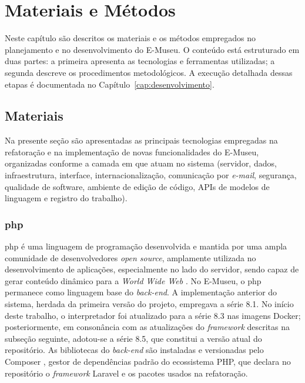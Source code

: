 \chapter{Materiais e Métodos}\label{cap:materiais-e-metodos}

Neste capítulo são descritos os materiais e os métodos empregados no planejamento e no desenvolvimento do E-Museu. O conteúdo está estruturado em duas partes: a primeira apresenta as tecnologias e ferramentas utilizadas; a segunda descreve os procedimentos metodológicos. A execução detalhada dessas etapas é documentada no Capítulo~\ref{cap:desenvolvimento}.


\section{Materiais}\label{sec:materiais}

Na presente seção são apresentadas as principais tecnologias empregadas na refatoração e na implementação de novas funcionalidades do E-Museu, organizadas conforme a camada em que atuam no sistema (servidor, dados, infraestrutura, interface, internacionalização, comunicação por \textit{e-mail}, segurança, qualidade de software, ambiente de edição de código, APIs de modelos de linguagem e registro do trabalho).


\subsection{\acrshort{php}}

\acrfull{php} é uma linguagem de programação desenvolvida e mantida por uma ampla comunidade de desenvolvedores \textit{open source}, amplamente utilizada no desenvolvimento de aplicações, especialmente no lado do servidor, sendo capaz de gerar conteúdo dinâmico para a \textit{World Wide Web} \cite{php}. No E-Museu, o \acrshort{php} permanece como linguagem base do \textit{back-end}. A implementação anterior do sistema, herdada da primeira versão do projeto, empregava a série 8.1. No início deste trabalho, o interpretador foi atualizado para a série 8.3 nas imagens Docker; posteriormente, em consonância com as atualizações do \textit{framework} descritas na subseção seguinte, adotou-se a série 8.5, que constitui a versão atual do repositório. As bibliotecas do \textit{back-end} são instaladas e versionadas pelo Composer \cite{composer}, gestor de dependências padrão do ecossistema PHP, que declara no repositório o \textit{framework} Laravel e os pacotes usados na refatoração.


